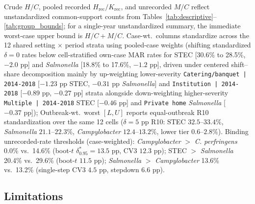\begin{table}[!htbp]
\par\smallskip\parbox{0.97\linewidth}{\footnotesize Crude $H/C$, pooled recorded $H_{\mathrm{rec}}/K_{\mathrm{rec}}$, and unrecorded $M/C$ reflect unstandardized common-support counts from Tables~\ref{tab:descriptive}--\ref{tab:group_bounds}; for a single-year unstandardized summary, the immediate worst-case upper bound is $H/C + M/C$. Case-wt.\ columns standardize across the 12 shared setting $\times$ period strata using pooled-case weights (shifting standardized $\delta = 0$ rates below cell-stratified own-case MAR rates for STEC [30.6\% to 28.5\%, $-2.0\text{ pp}$] and \textit{Salmonella} [18.8\% to 17.6\%, $-1.2\text{ pp}$], driven under centered shift--share decomposition mainly by up-weighting lower-severity \texttt{Catering/banquet\,|\,2014-2018} [$-1.23\text{ pp}$ STEC, $-0.31\text{ pp}$ \textit{Salmonella}] and \texttt{Institution\,|\,2014-2018} [$-0.89\text{ pp}$, $-0.27\text{ pp}$] strata alongside down-weighting higher-severity \texttt{Multiple\,|\,2014-2018} STEC [$-0.46\text{ pp}$] and \texttt{Private home} \textit{Salmonella} [$-0.37\text{ pp}$]); Outbreak-wt.\ worst $[L, U]$ reports equal-outbreak R10 standardization over the same 12 cells ($\delta = 5\text{ pp}$ R10: STEC $32.5$--$33.4\%$, \textit{Salmonella} $21.1$--$22.3\%$, \textit{Campylobacter} $12.4$--$13.2\%$, lower tier $0.6$--$2.8\%$). Binding unrecorded-rate thresholds (case-weighted): \textit{Campylobacter} $>$ \textit{C. perfringens} 0.0\% vs.\ 14.6\% (boot-$t$ $\delta^{*}_{0.95} = 13.5\text{ pp}$, CV3 $12.3\text{ pp}$); STEC $>$ \textit{Salmonella} 20.4\% vs.\ 29.6\% (boot-$t$ $11.5\text{ pp}$); \textit{Salmonella} $>$ \textit{Campylobacter} 13.6\% vs.\ 13.2\% (single-step CV3 $4.5\text{ pp}$, stepdown $6.6\text{ pp}$).}
\end{table}

\subsection{Limitations}\label{sec:limitations}

